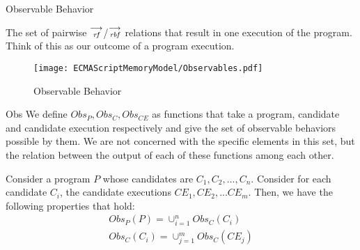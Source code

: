     \begin{definition}{Observable Behavior}
    
        The set of pairwise $\stackrel{\longrightarrow}{_\textit{rf}}$/$\stackrel{\longrightarrow}{_\textit{rbf}}$ relations that result in one execution of the program. Think of this as our outcome of a program execution.
    
        \begin{figure}[H]
            \centering
            \texttt{[image: ECMAScriptMemoryModel/Observables.pdf]}
            \caption{Observable Behavior}
            \label{fig:my_label}
        \end{figure}
        
    \end{definition}


    \begin{definition}{Obs}
        We define $Obs_P, Obs_C, Obs_{CE}$ as functions that take a program, candidate and candidate execution respectively and give the set of observable behaviors possible by them. We are not concerned with the specific elements in this set, but the relation between the output of each of these functions among each other. 

        Consider a program $P$ whose candidates are $C_1, C_2, ... , C_n$. Consider for each candidate $C_i$, the candidate executions $CE_1, CE_2, ... CE_m$. Then, we have the following properties that hold:
        \begin{align*}
            Obs_P(P) = \cup_{i=1}^{n}Obs_C(C_i) \\ 
            Obs_C(C_i) = \cup_{j=1}^{m}Obs_C(CE_j)
        \end{align*}

    \end{definition}

    